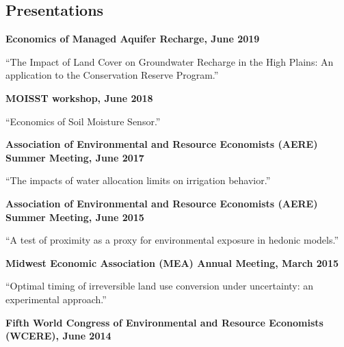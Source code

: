 \documentclass[10pt,margin,line]{res}
\newenvironment{list1}{
  \begin{list}{\ding{113}}{%
      \setlength{\itemsep}{0in}
      \setlength{\parsep}{0in} \setlength{\parskip}{0in}
      \setlength{\topsep}{0in} \setlength{\partopsep}{0in}
      \setlength{\leftmargin}{0.17in}}}{\end{list}}
\newenvironment{list2}{
  \begin{list}{-}{%
      \setlength{\itemsep}{0in}
      \setlength{\parsep}{0in} \setlength{\parskip}{0in}
      \setlength{\topsep}{0in} \setlength{\partopsep}{0in}
      \setlength{\leftmargin}{0.2in}}}{\end{list}}
\begin{document}
\begin{resume}
\section{\sc Presentations}
\begin{list1}

\item[] \textbf{Economics of Managed Aquifer Recharge, June 2019}
  \begin{list2}
  \item ``The Impact of Land Cover on Groundwater Recharge in the High Plains: An application to the Conservation Reserve Program.''
  \end{list2}
\vspace*{0.3cm}
\item[] \textbf{MOISST workshop, June 2018}
  \begin{list2}
  \item ``Economics of Soil Moisture Sensor.''
  \end{list2}
\vspace*{0.3cm}
\item[] \textbf{Association of Environmental and Resource Economists (AERE) Summer Meeting, June 2017}
  \begin{list2}
  \item ``The impacts of water allocation limits on irrigation behavior.''
  \end{list2}
\vspace*{0.3cm}
\item[] \textbf{Association of Environmental and Resource Economists (AERE) Summer Meeting, June 2015}
  \begin{list2}
  \item ``A test of proximity as a proxy for environmental exposure in hedonic models.''
  \end{list2}
\vspace*{0.3cm}
\item[] \textbf{Midwest Economic Association (MEA) Annual Meeting, March 2015}
  \begin{list2}
  \item ``Optimal timing of irreversible land use conversion under uncertainty: an experimental approach.''
  \end{list2}
\vspace*{0.3cm}
\item[] \textbf{Fifth World Congress of Environmental and Resource Economists (WCERE), June 2014}

\end{list1}
\end{resume}
\end{document}
